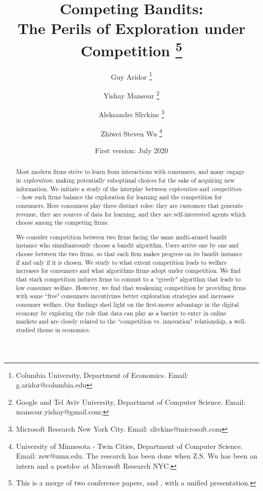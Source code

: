 \documentclass[11pt]{article}
\begin{document}

\title{Competing Bandits:\\ 
The Perils of Exploration under Competition%
\thanks{This is a merge of two conference papers,
\citet{CompetingBandits-itcs18} and \citet{CompetingBandits-ec19}, 
with a unified presentation.}}

\author{Guy Aridor%
\footnote{Columbia University, Department of Economics. Email: g.aridor@columbia.edu} 
\and
Yishay Mansour%
\footnote{Google and Tel Aviv University, Department of Computer Science. Email: mansour.yishay@gmail.com;} 
\and
Aleksandrs Slivkins%
\footnote{Microsoft Research New York City. Email: slivkins@microsoft.com} 
\and
Zhiwei Steven Wu%
\footnote{University of Minnesota - Twin Cities, Department of Computer Science. Email: zsw@umn.edu.\newline
The research has been done when Z.S. Wu has been an intern and a postdoc at Microsoft Research NYC.
}}
\date{First version: July 2020}
\maketitle
\begin{abstract}
Most modern firms strive to learn from interactions with consumers, and many engage in \emph{exploration}: making potentially suboptimal choices for the sake of acquiring new information. We initiate a study of the interplay between \emph{exploration} and \emph{competition}—how such firms balance the exploration for learning and the competition for consumers. Here consumers play three distinct roles: they are customers that generate revenue, they are sources of data for learning, and they are self-interested agents which choose among the competing firms.

We consider competition between two firms facing the same multi-armed bandit instance who simultaneously choose a bandit algorithm. Users arrive one by one and choose between the two firms, so that each firm makes progress on its bandit instance if and only if it is chosen. We study to what extent competition leads to welfare increases for consumers and what algorithms firms adopt under competition. We find that stark competition induces firms to commit to a ``greedy" algorithm that leads to low consumer welfare. However, we find that weakening competition by providing firms with some ``free" consumers incentivizes better exploration strategies and increases consumer welfare. Our findings shed light on the first-mover advantage in the digital economy by exploring the role that data can play as a barrier to entry in online markets and are closely related to the ``competition vs. innovation" relationship, a well-studied theme in economics.

\vspace{0.2in}

\bigskip
\end{abstract}
\end{document}
